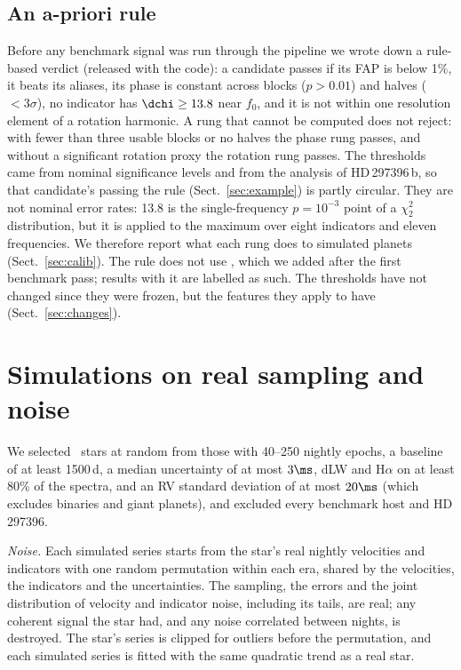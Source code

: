 \subsection{An a-priori rule}
\label{sec:rule}

Before any benchmark signal was run through the pipeline we wrote down a rule-based
verdict (released with the code): a candidate passes if its FAP is below 1\%, it
beats its aliases, its phase is constant across blocks ($p > 0.01$) and halves
($<3\sigma$), no indicator has $\dchi \ge 13.8$ near $f_0$, and it is not within one
resolution element of a rotation harmonic. A rung that cannot be computed does not
reject: with fewer than three usable blocks or no halves the phase rung passes, and
without a significant rotation proxy the rotation rung passes. The thresholds came from nominal
significance levels and from the analysis of HD\,297396\,b, so that candidate's
passing the rule (Sect.~\ref{sec:example}) is partly circular. They are not nominal
error rates: 13.8 is the single-frequency $p = 10^{-3}$ point of a $\chi^2_2$
distribution, but it is applied to the maximum over eight indicators and eleven
frequencies. We therefore report what each rung does to simulated planets
(Sect.~\ref{sec:calib}). The rule does not use , which we
added after the first benchmark pass; results with it are labelled as such. The
thresholds have not changed since they were frozen, but the features they apply to
have (Sect.~\ref{sec:changes}).

\section{Simulations on real sampling and noise}
\label{sec:sims}

We selected \nmSimStars\ stars at random from those with 40--250 nightly epochs, a
baseline of at least 1500\,d, a median uncertainty of at most $3\ms$, dLW and H$\alpha$
on at least 80\% of the spectra, and an RV standard deviation of at most $20\ms$
(which excludes binaries and giant planets), and excluded every benchmark host and
HD\,297396.

\emph{Noise.} Each simulated series starts from the star's real nightly velocities
and indicators with one random permutation within each era, shared by the
velocities, the indicators and the uncertainties. The sampling, the errors and the
joint distribution of velocity and indicator noise, including its tails, are real;
any coherent signal the star had, and any noise correlated between nights, is
destroyed. The star's series is clipped for outliers before the permutation, and each
simulated series is fitted with the same quadratic trend as a real star.

